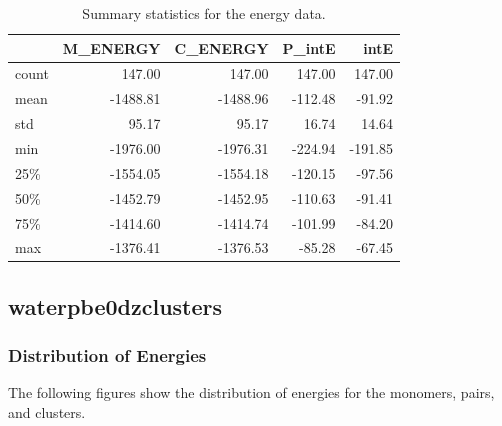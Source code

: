 \documentclass[journal=jacsat,manuscript=article]{achemso}
\begin{document}
\begin{table}[b!]
\centering
\caption{Summary statistics for the energy data.}
\label{tab:energy_stats}
\begin{tabular}{lrrrr}
\toprule
{} &  M\_ENERGY &  C\_ENERGY &  P\_intE &    intE \\
\midrule
count &    147.00 &    147.00 &  147.00 &  147.00 \\
mean  &  -1488.81 &  -1488.96 & -112.48 &  -91.92 \\
std   &     95.17 &     95.17 &   16.74 &   14.64 \\
min   &  -1976.00 &  -1976.31 & -224.94 & -191.85 \\
25\%   &  -1554.05 &  -1554.18 & -120.15 &  -97.56 \\
50\%   &  -1452.79 &  -1452.95 & -110.63 &  -91.41 \\
75\%   &  -1414.60 &  -1414.74 & -101.99 &  -84.20 \\
max   &  -1376.41 &  -1376.53 &  -85.28 &  -67.45 \\
\bottomrule
\end{tabular}
\end{table}

\subsection{waterpbe0dzclusters}
\subsubsection{Distribution of Energies} 
 The following figures show the distribution of energies for the monomers, pairs, and clusters.
\end{document}
